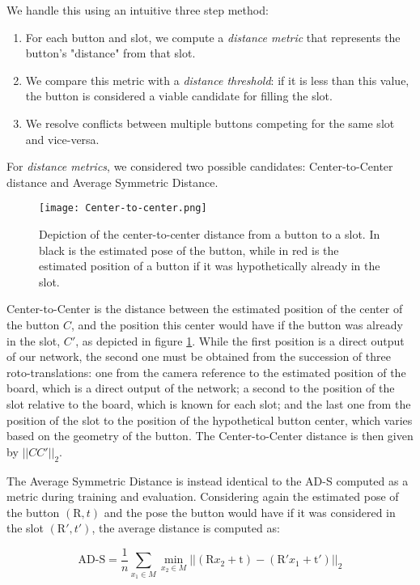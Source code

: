We handle this using an intuitive three step method:
\begin{enumerate}
    \item For each button and slot, we compute a \emph{distance metric} that represents the button's "distance" from that slot.
    \item We compare this metric with a \emph{distance threshold}: if it is less than this value, the button is considered a viable candidate for filling the slot.
    \item We resolve conflicts between multiple buttons competing for the same slot and vice-versa.
\end{enumerate}

For \emph{distance metrics}, we considered two possible candidates: Center-to-Center distance and Average Symmetric Distance.

\begin{figure}[ht]
    \texttt{[image: Center-to-center.png]}
    \caption{Depiction of the center-to-center distance from a button to a slot. In black is the estimated pose of the button, while in red is the estimated position of a button if it was hypothetically already in the slot.}
    \label{fig:center2center}
\end{figure}

Center-to-Center is the distance between the estimated position of the center of the button $C$, and the position this center would have if the button was already in the slot, $C'$, as depicted in figure \ref{fig:center2center}. While the first position is a direct output of our network, the second one must be obtained from the succession of three roto-translations: one from the camera reference to the estimated position of the board, which is a direct output of the network; a second to the position of the slot relative to the board, which is known for each slot; and the last one from the position of the slot to the position of the hypothetical button center, which varies based on the geometry of the button. The Center-to-Center distance is then given by $||CC'||_2$.

The Average Symmetric Distance is instead identical to the AD-S computed as a metric during training and evaluation. Considering again the estimated pose of the button $(\text{R}, t)$ and the pose the button would have if it was considered in the slot $(\text{R}', t')$, the average distance is computed as:

\begin{equation*}
    \text{AD-S} = \frac{1}{n} \sum_{x_1 \in M} \min_{x_2 \in M} ||(\text{R}x_2 + \text{t}) - 
    (\text{R}'x_1 + \text{t}')||_2
\end{equation*}

